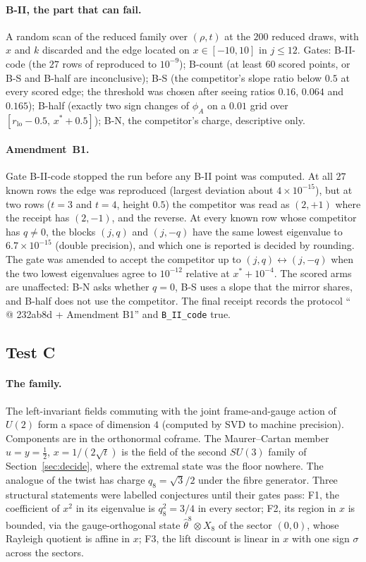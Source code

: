 \documentclass[11pt]{article}
\theoremstyle{definition}
\theoremstyle{remark}
\begin{document}
\paragraph{B-II, the part that can fail.} A random scan of the reduced family over $(\rho,t)$ at the $200$ reduced draws,
with $x$ and $k$ discarded and the edge located on $x\in[-10,10]$ in $j\le12$. Gates: B-II-code (the $27$ rows of
 reproduced to $10^{-9}$); B-count (at least $60$ scored points, or B-S and B-half are
inconclusive); B-S (the competitor's slope ratio below $0.5$ at every scored edge; the threshold was chosen after seeing
ratios $0.16$, $0.064$ and $0.165$); B-half (exactly two sign changes of $\phi_A$ on a $0.01$ grid over
$[r_{\mathrm{lo}}-0.5,\,x^*+0.5]$); B-N, the competitor's charge, descriptive only.

\paragraph{Amendment~B1.} Gate B-II-code stopped the run before any B-II point was computed. At all $27$ known rows the
edge was reproduced (largest deviation about $4\times10^{-15}$), but at two rows ($t=3$ and $t=4$, height $0.5$) the
competitor was read as $(2,+1)$ where the receipt has $(2,-1)$, and the reverse. At every known row whose competitor has
$q\ne0$, the blocks $(j,q)$ and $(j,-q)$ have the same lowest eigenvalue to $6.7\times10^{-15}$ (double precision), and
which one is reported is decided by rounding. The gate was amended to accept the competitor up to
$(j,q)\leftrightarrow(j,-q)$ when the two lowest eigenvalues agree to $10^{-12}$ relative at $x^*+10^{-4}$. The scored
arms are unaffected: B-N asks whether $q=0$, B-S uses a slope that the mirror shares, and B-half does not use the
competitor. The final receipt  records the protocol ``
@ 232ab8d + Amendment B1'' and \texttt{B\_II\_code} true.

\subsection{Test C}

\paragraph{The family.} The left-invariant fields commuting with the joint frame-and-gauge action of $U(2)$ form a space
of dimension $4$ (computed by SVD to machine precision). Components are in the orthonormal coframe. The Maurer--Cartan
member $u=y=\tfrac12$, $x=1/(2\sqrt t)$ is the field of the second $SU(3)$ family of Section~\ref{sec:decide}, where the
extremal state was the floor nowhere. The analogue of the twist has charge $q_8=\sqrt3/2$ under the fibre generator.
Three structural statements were labelled conjectures until their gates pass: F1, the coefficient of $x^2$ in its
eigenvalue is $q_8^2=3/4$ in every sector; F2, its region in $x$ is bounded, via the gauge-orthogonal state
$\hat\theta^8\otimes X_8$ of the sector $(0,0)$, whose Rayleigh quotient is affine in $x$; F3, the lift discount is linear
in $x$ with one sign $\sigma$ across the sectors.
\end{document}
